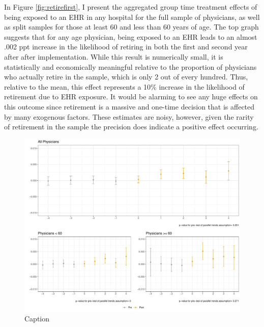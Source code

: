 \documentclass[11pt]{article}
\begin{document}
In Figure \ref{fig:retirefirst}, I present the aggregated group time treatment effects of being exposed to an EHR in any hospital for the full sample of physicians, as well as split samples for those at least 60 and less than 60 years of age. The top graph suggests that for any age physician, being exposed to an EHR leads to an almost .002 ppt increase in the likelihood of retiring in both the first and second year after after implementation. While this result is numerically small, it is statistically and economically meaningful relative to the proportion of physicians who actually retire in the sample, which is only 2 out of every hundred. Thus, relative to the mean, this effect represents a 10\% increase in the likelihood of retirement due to EHR exposure. It would be alarming to see any huge effects on this outcome since retirement is a massive and one-time decision that is affected by many exogenous factors. These estimates are noisy, however, given the rarity of retirement in the sample the precision does indicate a positive effect occurring.

\begin{figure}
    \centering
    \includegraphics[scale=.8]{Objects/retire_plot.pdf}
    \caption{Caption}
    \label{fig:my_label}
\end{figure}
\end{document}
